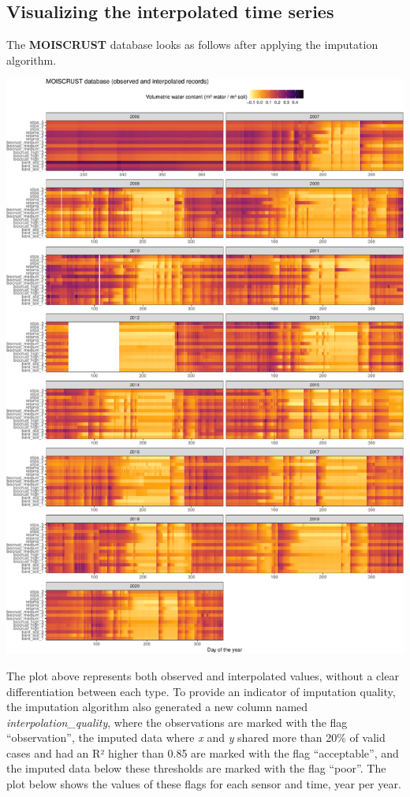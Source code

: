 \documentclass[]{article}
\begin{document}
\hypertarget{visualizing-the-interpolated-time-series}{%
\subsection{Visualizing the interpolated time
series}\label{visualizing-the-interpolated-time-series}}

The \textbf{MOISCRUST} database looks as follows after applying the
imputation algorithm.

\includegraphics{moiscrust_files/figure-latex/unnamed-chunk-29-1.pdf}

The plot above represents both observed and interpolated values, without
a clear differentiation between each type. To provide an indicator of
imputation quality, the imputation algorithm also generated a new column
named \emph{interpolation\_quality}, where the observations are marked
with the flag ``observation'', the imputed data where \emph{x} and
\emph{y} shared more than 20\% of valid cases and had an R² higher than
0.85 are marked with the flag ``acceptable'', and the imputed data below
these thresholds are marked with the flag ``poor''. The plot below shows
the values of these flags for each sensor and time, year per year.
\end{document}
